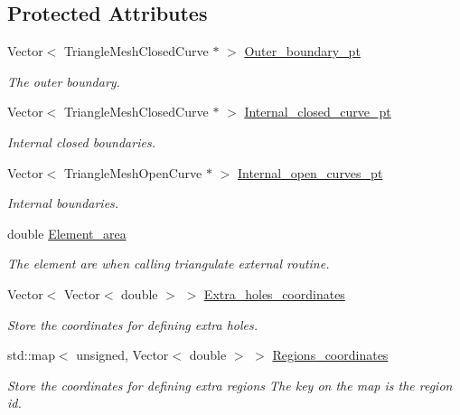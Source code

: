 \subsection*{Protected Attributes}
\begin{DoxyCompactItemize}
\item 
Vector$<$ Triangle\+Mesh\+Closed\+Curve $\ast$ $>$ \hyperlink{classoomph_1_1TriangleMeshParameters_ab68819894ffa01f268c2ef861a45e108}{Outer\+\_\+boundary\+\_\+pt}
\begin{DoxyCompactList}\small\item\em The outer boundary. \end{DoxyCompactList}\item 
Vector$<$ Triangle\+Mesh\+Closed\+Curve $\ast$ $>$ \hyperlink{classoomph_1_1TriangleMeshParameters_a99475f8749f590b46554e6e6d9e8af78}{Internal\+\_\+closed\+\_\+curve\+\_\+pt}
\begin{DoxyCompactList}\small\item\em Internal closed boundaries. \end{DoxyCompactList}\item 
Vector$<$ Triangle\+Mesh\+Open\+Curve $\ast$ $>$ \hyperlink{classoomph_1_1TriangleMeshParameters_af6a11e437a5c14d6c160160cf2a3c79a}{Internal\+\_\+open\+\_\+curves\+\_\+pt}
\begin{DoxyCompactList}\small\item\em Internal boundaries. \end{DoxyCompactList}\item 
double \hyperlink{classoomph_1_1TriangleMeshParameters_afb48563db8d81652f699b3bc5964c8e3}{Element\+\_\+area}
\begin{DoxyCompactList}\small\item\em The element are when calling triangulate external routine. \end{DoxyCompactList}\item 
Vector$<$ Vector$<$ double $>$ $>$ \hyperlink{classoomph_1_1TriangleMeshParameters_aa503725c7d6941b3b55d00498576ea5a}{Extra\+\_\+holes\+\_\+coordinates}
\begin{DoxyCompactList}\small\item\em Store the coordinates for defining extra holes. \end{DoxyCompactList}\item 
std\+::map$<$ unsigned, Vector$<$ double $>$ $>$ \hyperlink{classoomph_1_1TriangleMeshParameters_a6c1715f0b7b47ec999766afde7e85d91}{Regions\+\_\+coordinates}
\begin{DoxyCompactList}\small\item\em Store the coordinates for defining extra regions The key on the map is the region id. \end{DoxyCompactList}\item 

\end{DoxyCompactItemize}
